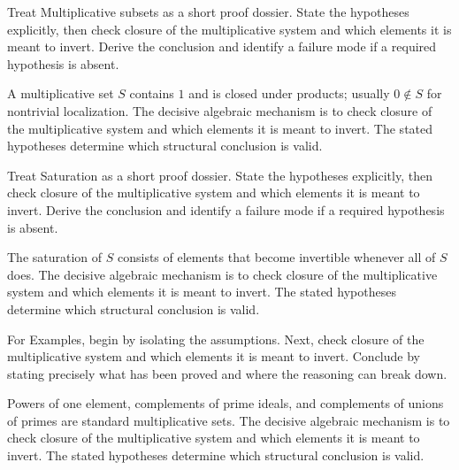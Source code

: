 \begin{problem}\label{prob:v05-problem-01}
Treat Multiplicative subsets as a short proof dossier. State the hypotheses explicitly, then check closure of the multiplicative system and which elements it is meant to invert. Derive the conclusion and identify a failure mode if a required hypothesis is absent.
\end{problem}
\begin{solution}
A multiplicative set $S$ contains $1$ and is closed under products; usually $0\notin S$ for nontrivial localization. The decisive algebraic mechanism is to check closure of the multiplicative system and which elements it is meant to invert. The stated hypotheses determine which structural conclusion is valid.
\end{solution}

\begin{problem}\label{prob:v05-problem-02}
Treat Saturation as a short proof dossier. State the hypotheses explicitly, then check closure of the multiplicative system and which elements it is meant to invert. Derive the conclusion and identify a failure mode if a required hypothesis is absent.
\end{problem}
\begin{solution}
The saturation of $S$ consists of elements that become invertible whenever all of $S$ does. The decisive algebraic mechanism is to check closure of the multiplicative system and which elements it is meant to invert. The stated hypotheses determine which structural conclusion is valid.
\end{solution}

\begin{problem}\label{prob:v05-problem-03}
For Examples, begin by isolating the assumptions. Next, check closure of the multiplicative system and which elements it is meant to invert. Conclude by stating precisely what has been proved and where the reasoning can break down.
\end{problem}
\begin{solution}
Powers of one element, complements of prime ideals, and complements of unions of primes are standard multiplicative sets. The decisive algebraic mechanism is to check closure of the multiplicative system and which elements it is meant to invert. The stated hypotheses determine which structural conclusion is valid.
\end{solution}

